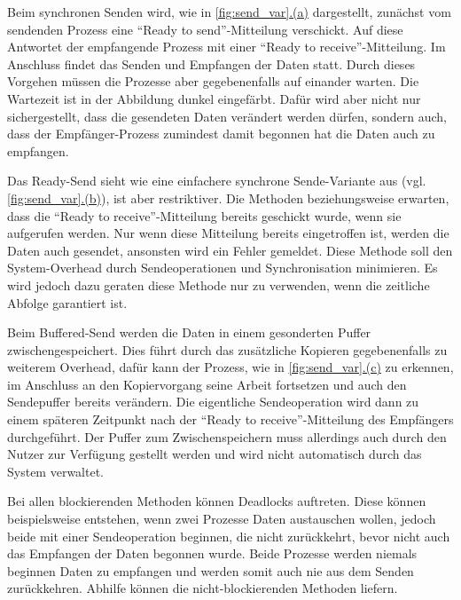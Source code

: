     Beim synchronen Senden wird, wie in \autoref{fig:send_var}\hyperref[fig:sync_send]{.(a)} dargestellt, zunächst vom sendenden Prozess eine ``Ready to send''-Mitteilung verschickt. Auf 
    diese Antwortet der empfangende Prozess mit einer ``Ready to receive''-Mitteilung. Im Anschluss findet das Senden und Empfangen der Daten statt. Durch dieses Vorgehen müssen die Prozesse
    aber gegebenenfalls auf einander warten. Die Wartezeit ist in der Abbildung dunkel eingefärbt. Dafür wird aber nicht nur sichergestellt, dass die gesendeten Daten verändert werden dürfen,
    sondern auch, dass der Empfänger-Prozess zumindest damit begonnen hat die Daten auch zu empfangen. \citep{mpi_p2p, mpiv31}
    
    Das Ready-Send sieht wie eine einfachere synchrone Sende-Variante aus (vgl. \autoref{fig:send_var}\hyperref[fig:ready_send]{.(b)}), ist aber restriktiver. Die Methoden 
    beziehungsweise  erwarten, dass die ``Ready to receive''-Mitteilung bereits geschickt wurde, wenn sie aufgerufen werden. Nur wenn diese Mitteilung bereits eingetroffen
    ist, werden die Daten auch gesendet, ansonsten wird ein Fehler gemeldet. Diese Methode soll den System-Overhead durch Sendeoperationen und Synchronisation minimieren. Es wird jedoch 
    dazu geraten diese Methode nur zu verwenden, wenn die zeitliche Abfolge garantiert ist. \citep{mpi_p2p, mpiv31}
    
    Beim Buffered-Send werden die Daten in einem gesonderten Puffer zwischengespeichert. Dies führt durch das zusätzliche Kopieren gegebenenfalls zu weiterem Overhead, dafür kann der 
    Prozess, wie in \autoref{fig:send_var}\hyperref[fig:buff_send]{.(c)} zu erkennen, im Anschluss an den Kopiervorgang seine Arbeit fortsetzen und auch den Sendepuffer bereits verändern. 
    Die eigentliche Sendeoperation wird dann zu einem späteren Zeitpunkt nach der ``Ready to receive''-Mitteilung des Empfängers durchgeführt. Der Puffer zum Zwischenspeichern muss allerdings 
    auch durch den Nutzer zur Verfügung gestellt werden und wird nicht automatisch durch das System verwaltet. \citep{mpi_p2p, mpiv31}
    
    Bei allen blockierenden Methoden können Deadlocks auftreten. Diese können beispielsweise entstehen, wenn zwei Prozesse Daten austauschen wollen, jedoch beide mit einer Sendeoperation
    beginnen, die nicht zurückkehrt, bevor nicht auch das Empfangen der Daten begonnen wurde. Beide Prozesse werden niemals beginnen Daten zu empfangen und werden somit auch
    nie aus dem Senden zurückkehren. Abhilfe können die nicht-blockierenden Methoden liefern.
    
